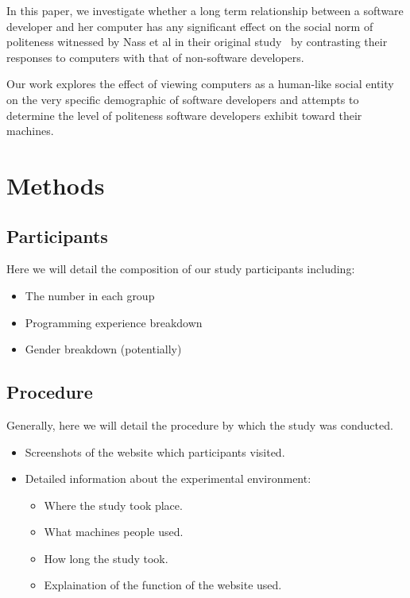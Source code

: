 \documentclass{sig-alternate-05-2015}
\begin{document}
\hfill

In this paper, we investigate whether a long term relationship between a software developer and her computer has any significant effect on the social norm of politeness witnessed by Nass et al in their original study~\cite{nass1999people} by contrasting their responses to computers with that of non-software developers.

Our work explores the effect of viewing computers as a human-like social entity on the very specific demographic of software developers and attempts to determine the level of politeness software developers exhibit toward their machines.


\section{Methods}

\subsection{Participants}
Here we will detail the composition of our study participants including:
\begin{itemize}
    \item The number in each group
    \item Programming experience breakdown
    \item Gender breakdown (potentially)
\end{itemize}

\subsection{Procedure}
Generally, here we will detail the procedure by which the study was conducted.

\begin{itemize}
    \item Screenshots of the website which participants visited.
    \item Detailed information about the experimental environment: 
    \begin{itemize}
        \item Where the study took place.
        \item What machines people used.
        \item How long the study took.
        \item Explaination of the function of the website used.
    \end{itemize}
\end{itemize}
 
\end{document}
